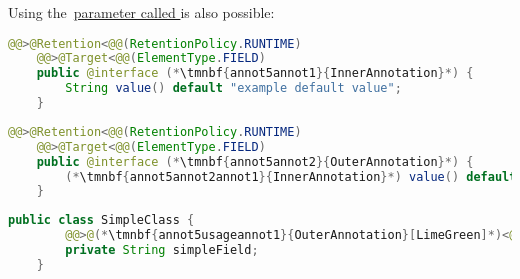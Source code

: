 \noindent Using the~\hyperref[javaannotationparamvalue]{parameter called } is also possible:
\begin{lstlisting}[language=Java, title={Inner annotation}]
    @@>@Retention<@@(RetentionPolicy.RUNTIME)
    @@>@Target<@@(ElementType.FIELD)
    public @interface (*\tmnbf{annot5annot1}{InnerAnnotation}*) {
        String value() default "example default value";
    }
\end{lstlisting}
\begin{lstlisting}[language=Java, title={Outer annotation}]
    @@>@Retention<@@(RetentionPolicy.RUNTIME)
    @@>@Target<@@(ElementType.FIELD)
    public @interface (*\tmnbf{annot5annot2}{OuterAnnotation}*) {
        (*\tmnbf{annot5annot2annot1}{InnerAnnotation}*) value() default @@>@(*\tmnbf{annot5annot2annot2}{InnerAnnotation}[LimeGreen]*)<@@("overridden default value");
    }
\end{lstlisting}
\begin{lstlisting}[language=Java, title={Usage}]
    public class SimpleClass {
        @@>@(*\tmnbf{annot5usageannot1}{OuterAnnotation}[LimeGreen]*)<@@(@@>@(*\tmnbf{annot5usageannot2}{InnerAnnotation}[LimeGreen]*)<@@("new value"))
        private String simpleField;
    }
\end{lstlisting}

